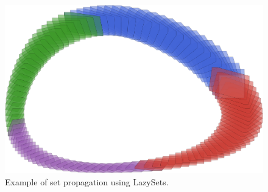 \begin{figure}[t]
	\centering
	\includegraphics[width=0.7\linewidth, keepaspectratio]{img/lotkavolterra}
	\vspace*{1mm}
	\caption{Example of set propagation using LazySets.}
	\label{fig:lotka_volterra}
\end{figure}
